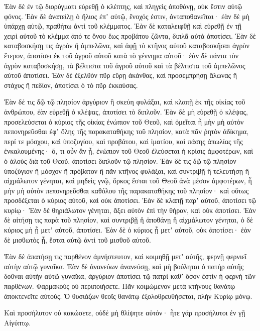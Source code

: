 {Ἐὰν δὲ ἐν τῷ διορύγματι εὑρεθῇ ὁ κλέπτης, καὶ πληγεὶς ἀποθάνῃ, οὐκ ἔστιν αὐτῷ φόνος.
Ἐὰν δὲ ἀνατείλῃ ὁ ἥλιος ἐπʼ αὐτῷ, ἔνοχός ἐστιν, ἀνταποθανεῖται· ἐὰν δὲ μὴ ὑπάρχῃ αὐτῷ, πραθήτω ἀντὶ τοῦ κλέμματος.
Ἐὰν δὲ καταλειφθῇ καὶ εὑρεθῇ ἐν τῇ χειρὶ αὐτοῦ τὸ κλέμμα ἀπό τε ὄνου ἕως προβάτου ζῶντα, διπλᾶ αὐτὰ ἀποτίσει.
Ἐὰν δὲ καταβοσκήσῃ τις ἀγρὸν ἢ ἀμπελῶνα, καὶ ἀφῇ τὸ κτῆνος αὐτοῦ καταβοσκῆσαι ἀγρὸν ἕτερον, ἀποτίσει ἐκ τοῦ ἀγροῦ αὐτοῦ κατὰ τὸ γέννημα αὐτοῦ· ἐὰν δὲ πάντα τὸν ἀγρὸν καταβοσκήσῃ, τὰ βέλτιστα τοῦ ἀγροῦ αὐτοῦ καὶ τὰ βέλτιστα τοῦ ἀμπελῶνος αὐτοῦ ἀποτίσει.
Ἐὰν δὲ ἐξελθὸν πῦρ εὕρῃ ἀκάνθας, καὶ προσεμπρήσῃ ἅλωνας ἢ στάχυς ἢ πεδίον, ἀποτίσει ὁ τὸ πῦρ ἐκκαύσας.
\par }{\PP {}Ἐὰν δέ τις δῷ τῷ πλησίον ἀργύριον ἢ σκεύη φυλάξαι, καὶ κλαπῇ ἐκ τῆς οἰκίας τοῦ ἀνθρώπου, ἐὰν εὑρεθῇ ὁ κλέψας, ἀποτίσει τὸ διπλοῦν.
Ἐὰν δὲ μὴ εὑρεθῇ ὁ κλέψας, προσελεύσεται ὁ κύριος τῆς οἰκίας ἐνώπιον τοῦ Θεοῦ, καὶ ὀμεῖται ἦ μὴν μὴ αὐτὸν πεπονηρεῦσθαι ἐφʼ ὅλης τῆς παρακαταθήκης τοῦ πλησίον,
κατὰ πᾶν ῥητὸν ἀδίκημα, περί τε μόσχου, καὶ ὑποζυγίου, καὶ προβάτου, καὶ ἱματίου, καὶ πάσης ἀπωλίας τῆς ἐνκαλουμένης· ὅ, τι οὖν ἂν ᾖ, ἐνώπιον τοῦ Θεοῦ ἐλεύσεται ἡ κρίσις ἀμφοτέρων, καὶ ὁ ἁλοὺς διὰ τοῦ Θεοῦ, ἀποτίσει διπλοῦν τῷ πλησίον.
Ἐὰν δέ τις δῷ τῷ πλησίον ὑποζύγιον ἢ μόσχον ἢ πρόβατον ἢ πᾶν κτῆνος φυλάξαι, καὶ συντριβῇ ἢ τελευτήσῃ ἢ αἰχμάλωτον γένηται, καὶ μηδεὶς γνῷ,
ὅρκος ἔσται τοῦ Θεοῦ ἀνὰ μέσον ἀμφοτέρων, ἦ μὴν μὴ αὐτὸν πεπονηρεῦσθαι καθόλου τῆς παρακαταθήκης τοῦ πλησίον· καὶ οὕτως προσδέξεται ὁ κύριος αὐτοῦ, καὶ οὐκ ἀποτίσει.
Ἐὰν δὲ κλαπῇ παρʼ αὐτοῦ, ἀποτίσει τῷ κυρίῳ·
Ἐὰν δὲ θηριάλωτον γένηται, ἄξει αὐτὸν ἐπὶ τὴν θήραν, καὶ οὐκ ἀποτίσει.
Ἐὰν δὲ αἰτήσῃ τις παρὰ τοῦ πλησίον, καὶ συντριβῇ ἢ ἀποθάνῃ ἢ αἰχμάλωτον γένηται, ὁ δὲ κύριος μὴ ᾖ μετʼ αὐτοῦ, ἀποτίσει.
Ἐὰν δὲ ὁ κύριος ᾖ μετʼ αὐτοῦ, οὐκ ἀποτίσει· ἐὰν δὲ μισθωτὸς ᾖ, ἔσται αὐτῷ ἀντὶ τοῦ μισθοῦ αὐτοῦ.
\par }{\PP {}Ἐὰν δὲ ἀπατήσῃ τις παρθένον ἀμνήστευτον, καὶ κοιμηθῇ μετʼ αὐτῆς, φερνῇ φερνιεῖ αὐτὴν αὐτῷ γυναῖκα.
Ἐὰν δὲ ἀνανεύων ἀνανεύσῃ, καὶ μὴ βούληται ὁ πατὴρ αὐτῆς δοῦναι αὐτὴν αὐτῷ γυναῖκα, ἀργύριον ἀποτίσει τῷ πατρὶ καθʼ ὅσον ἐστὶν ἡ φερνὴ τῶν παρθένων.
Φαρμακοὺς οὐ περιποιήσετε.
Πᾶν κοιμώμενον μετὰ κτήνους θανάτῳ ἀποκτενεῖτε αὐτούς.
Ὁ θυσιάζων θεοῖς θανάτῳ ἐξολοθρευθήσεται, πλὴν Κυρίῳ μόνῳ.
\par }{\PP {}Καὶ προσήλυτον οὐ κακώσετε, οὐδὲ μὴ θλίψητε αὐτόν· ἦτε γάρ προσήλυτοι ἐν γῇ Αἰγύπτῳ.
}
